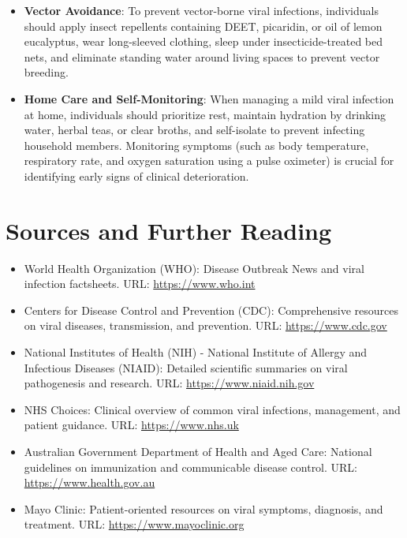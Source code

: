 \begin{itemize}
    \item \textbf{Vector Avoidance}: To prevent vector-borne viral infections, individuals should apply insect repellents containing DEET, picaridin, or oil of lemon eucalyptus, wear long-sleeved clothing, sleep under insecticide-treated bed nets, and eliminate standing water around living spaces to prevent vector breeding.
    \item \textbf{Home Care and Self-Monitoring}: When managing a mild viral infection at home, individuals should prioritize rest, maintain hydration by drinking water, herbal teas, or clear broths, and self-isolate to prevent infecting household members. Monitoring symptoms (such as body temperature, respiratory rate, and oxygen saturation using a pulse oximeter) is crucial for identifying early signs of clinical deterioration.
\end{itemize}

\section*{Sources and Further Reading}
\begin{itemize}
    \item World Health Organization (WHO): Disease Outbreak News and viral infection factsheets. URL: \url{https://www.who.int}
    \item Centers for Disease Control and Prevention (CDC): Comprehensive resources on viral diseases, transmission, and prevention. URL: \url{https://www.cdc.gov}
    \item National Institutes of Health (NIH) - National Institute of Allergy and Infectious Diseases (NIAID): Detailed scientific summaries on viral pathogenesis and research. URL: \url{https://www.niaid.nih.gov}
    \item NHS Choices: Clinical overview of common viral infections, management, and patient guidance. URL: \url{https://www.nhs.uk}
    \item Australian Government Department of Health and Aged Care: National guidelines on immunization and communicable disease control. URL: \url{https://www.health.gov.au}
    \item Mayo Clinic: Patient-oriented resources on viral symptoms, diagnosis, and treatment. URL: \url{https://www.mayoclinic.org}
\end{itemize}